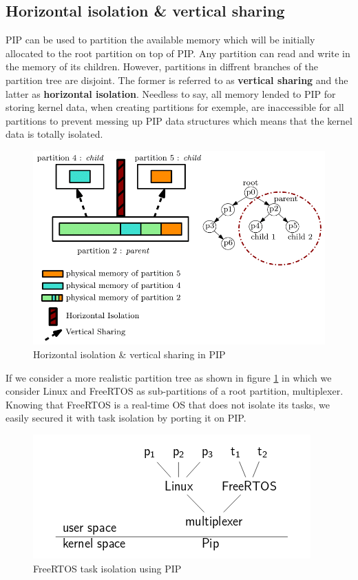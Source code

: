 \subsection{Horizontal isolation \& vertical sharing}

PIP can be used to partition the available memory which will be initially allocated to the root partition on top of PIP. Any partition can read and write in the memory of its children. However, partitions in diffrent branches of the partition tree are disjoint. The former is referred to as \textbf{vertical sharing} and the latter as \textbf{horizontal isolation}. Needless to say, all memory lended to PIP for storing kernel data, when creating partitions for exemple, are inaccessible for all partitions to prevent messing up PIP data structures which means that the kernel data is totally isolated.
   
\begin{figure}[!ht]
	\centering 
	\includegraphics[width=0.8\linewidth,frame]{img/memoryIsolShare.png} 
	\caption{Horizontal isolation \& vertical sharing in PIP}
\end{figure}

\noindent If we consider a more realistic partition tree as shown in figure \ref{FreeRTOS} in which we consider Linux and FreeRTOS as sub-partitions of a root partition, multiplexer. Knowing that FreeRTOS is a real-time OS that does not isolate its tasks, we easily secured it with task isolation by porting it on PIP.

\begin{figure}[!ht] \label{FreeRTOS}
	\centering 
	\includegraphics[scale=0.5,frame]{img/FreeRTOSEx.png} 
	\caption{FreeRTOS task isolation using PIP}
\end{figure}

